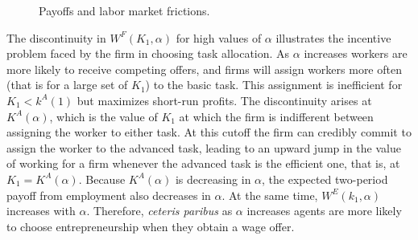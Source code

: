 \documentclass[12pt,american]{paper}
\theoremstyle{remark}
\begin{document}
\begin{figure}[h!]
{
}
\caption{Payoffs and labor market frictions.} 
\label{fig:effect-labor}
\end{figure}

%
The discontinuity in $W^F(K_1,\alpha)$ for high values of $\alpha$ illustrates the incentive problem faced by the firm in choosing task allocation. As $\alpha$ increases workers are more likely to receive competing offers, and firms will assign workers more often (that is for a large set of $K_1$) to the basic task. This assignment is inefficient for $K_1<k^A(1)$ but maximizes short-run profits. The discontinuity arises at $K^A(\alpha)$, which is the value of $K_1$ at which the firm is indifferent between assigning the worker to either task. At this cutoff the firm can credibly commit to assign the worker to the advanced task, leading to an upward jump in the value of working for a firm whenever the advanced task is the efficient one, that is, at $K_1=K^A(\alpha)$.
Because $K^A(\alpha)$ is decreasing in $\alpha$,   the  expected two-period payoff from employment  also decreases in $\alpha$. At the same time, $W^E(k_1,\alpha)$ increases with $\alpha$.   Therefore,  \textit{ceteris paribus} as $\alpha$ increases agents are more likely to choose entrepreneurship when they obtain a wage offer. %
 
\end{document}
